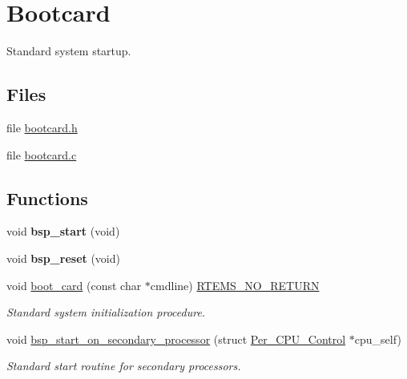 \hypertarget{group__RTEMSBSPsSharedStartup}{}\section{Bootcard}
\label{group__RTEMSBSPsSharedStartup}


Standard system startup.  


\subsection*{Files}
\begin{DoxyCompactItemize}
\item 
file \mbox{\hyperlink{bootcard_8h}{bootcard.\+h}}
\item 
file \mbox{\hyperlink{bootcard_8c}{bootcard.\+c}}
\end{DoxyCompactItemize}
\subsection*{Functions}
\begin{DoxyCompactItemize}
\item 
\mbox{\label{group__RTEMSBSPsSharedStartup_ga424dcf8c1e22bf623eb1210a0aa2a3e9}} 
void {\bfseries bsp\+\_\+start} (void)
\item 
\mbox{\label{group__RTEMSBSPsSharedStartup_gaee99733067120706ee7d3395ea225dfb}} 
void {\bfseries bsp\+\_\+reset} (void)
\item 
void \mbox{\hyperlink{group__RTEMSBSPsSharedStartup_gad8a18766fa4f3cf67d8f8ff8938008e0}{boot\+\_\+card}} (const char $\ast$cmdline) \mbox{\hyperlink{group__RTEMSScoreBaseDefs_gaa2f0ed67aa174f684bb31b7e8bdb386f}{R\+T\+E\+M\+S\+\_\+\+N\+O\+\_\+\+R\+E\+T\+U\+RN}}
\begin{DoxyCompactList}\small\item\em Standard system initialization procedure. \end{DoxyCompactList}\item 
void \mbox{\hyperlink{group__RTEMSBSPsSharedStartup_gae847768d4b83b8e3e4bc7313095ef7dd}{bsp\+\_\+start\+\_\+on\+\_\+secondary\+\_\+processor}} (struct \mbox{\hyperlink{structPer__CPU__Control}{Per\+\_\+\+C\+P\+U\+\_\+\+Control}} $\ast$cpu\+\_\+self)
\begin{DoxyCompactList}\small\item\em Standard start routine for secondary processors. \end{DoxyCompactList}\end{DoxyCompactItemize}
